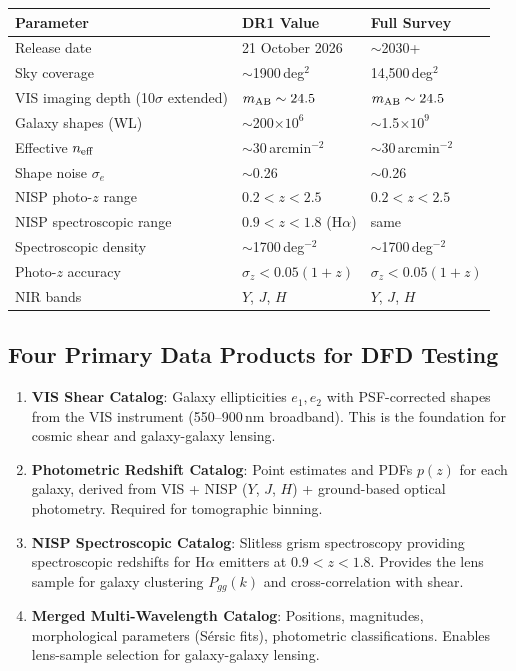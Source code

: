 \documentclass[11pt,a4paper]{article}
\begin{document}
\begin{center}
\begin{tabular}{lll}
\toprule
\textbf{Parameter} & \textbf{DR1 Value} & \textbf{Full Survey} \\
\midrule
Release date & 21 October 2026 & $\sim$2030+ \\
Sky coverage & $\sim$1900\,deg$^2$ & 14,500\,deg$^2$ \\
VIS imaging depth (10$\sigma$ extended) & $m_{\rm AB} \sim 24.5$ & $m_{\rm AB} \sim 24.5$ \\
Galaxy shapes (WL) & $\sim$200$\times 10^6$ & $\sim$1.5$\times 10^9$ \\
Effective $n_{\rm eff}$ & $\sim$30\,arcmin$^{-2}$ & $\sim$30\,arcmin$^{-2}$ \\
Shape noise $\sigma_e$ & $\sim$0.26 & $\sim$0.26 \\
NISP photo-$z$ range & $0.2 < z < 2.5$ & $0.2 < z < 2.5$ \\
NISP spectroscopic range & $0.9 < z < 1.8$ (H$\alpha$) & same \\
Spectroscopic density & $\sim$1700\,deg$^{-2}$ & $\sim$1700\,deg$^{-2}$ \\
Photo-$z$ accuracy & $\sigma_z < 0.05(1+z)$ & $\sigma_z < 0.05(1+z)$ \\
NIR bands & $Y$, $J$, $H$ & $Y$, $J$, $H$ \\
\bottomrule
\end{tabular}
\end{center}

\subsection{Four Primary Data Products for DFD Testing}

\begin{enumerate}[label=\textbf{DP\arabic*}:]
\item \textbf{VIS Shear Catalog}: Galaxy ellipticities $e_1, e_2$ with
  PSF-corrected shapes from the VIS instrument (550--900\,nm broadband).
  This is the foundation for cosmic shear and galaxy-galaxy lensing.

\item \textbf{Photometric Redshift Catalog}: Point estimates and PDFs
  $p(z)$ for each galaxy, derived from VIS + NISP ($Y$, $J$, $H$) +
  ground-based optical photometry. Required for tomographic binning.

\item \textbf{NISP Spectroscopic Catalog}: Slitless grism spectroscopy
  providing spectroscopic redshifts for H$\alpha$ emitters at
  $0.9 < z < 1.8$. Provides the lens sample for galaxy clustering
  $P_{gg}(k)$ and cross-correlation with shear.

\item \textbf{Merged Multi-Wavelength Catalog}: Positions, magnitudes,
  morphological parameters (S\'{e}rsic fits), photometric
  classifications. Enables lens-sample selection for galaxy-galaxy
  lensing.
\end{enumerate}
\end{document}
